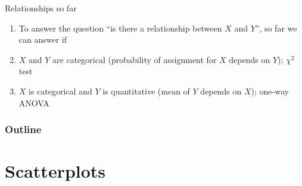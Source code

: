 %
%
%



\subtitle{and the correlation coefficient}

\date{21 April 2015}







\begin{frame}
  \maketitle
\end{frame}



\begin{frame}{Relationships so far}
  \begin{enumerate}
    \item To answer the question ``is there a relationship between $X$ and $Y$'',
      so far we can answer if
    \item $X$ and $Y$ are categorical (probability of assignment for $X$ depends on $Y$); $\chi^2$ test
    \item $X$ is categorical and $Y$ is quantitative (mean of $Y$ depends on $X$); one-way ANOVA
  \end{enumerate}
\end{frame}

\begin{frame}\frametitle<presentation>{Outline}
  \tableofcontents
\end{frame}


\section{Scatterplots}

